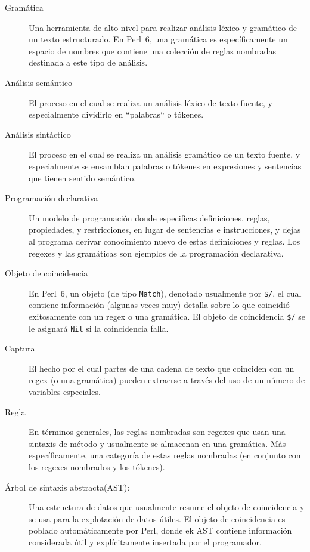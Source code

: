 \begin{description}

\item[Gramática] Una herramienta de alto nivel para realizar
análisis léxico y gramático de un texto estructurado. En Perl~6, 
una gramática es específicamente un espacio de nombres que 
contiene una colección de reglas nombradas destinada a este 
tipo de análisis.

\item[Análisis semántico] El proceso en el cual se realiza
un análisis léxico de texto fuente, y especialmente dividirlo
en ``palabras`` o tókenes.

\item[Análisis sintáctico] El proceso en el cual se realiza un
análisis gramático de un texto fuente, y especialmente se ensamblan
palabras o tókenes en expresiones y sentencias que 
tienen sentido semántico.

\item[Programación declarativa] Un modelo de programación donde
especificas definiciones, reglas, propiedades, y restricciones, 
en lugar de sentencias e instrucciones, y dejas al programa derivar
conocimiento nuevo de estas definiciones y reglas.  Los regexes
y las gramáticas son ejemplos de la programación declarativa.

\item[Objeto de coincidencia] En Perl~6, un objeto (de tipo {\tt Match}),
denotado usualmente por \verb|$/|, el cual contiene información 
(algunas veces muy) detalla sobre lo que coincidió exitosamente
con un regex o una gramática. El objeto de coincidencia \verb|$/|
se le asignará {\tt Nil} si la coincidencia falla.

\item[Captura] El hecho por el cual partes de una cadena de texto
que coinciden con un regex (o una gramática) pueden extraerse
a través del uso de un número de variables especiales.

\item[Regla] En términos generales, las reglas nombradas son regexes
que usan una sintaxis de método y usualmente se almacenan en una
gramática. Más específicamente, una categoría de estas reglas nombradas
(en conjunto con los regexes nombrados y los tókenes).

\item[Árbol de sintaxis abstracta(AST):] Una estructura de datos
que usualmente resume el objeto de coincidencia y se usa para la
explotación de datos útiles. El objeto de coincidencia es poblado 
automáticamente por Perl, donde ek AST contiene información considerada
útil y explícitamente insertada por el programador.


\end{description}
